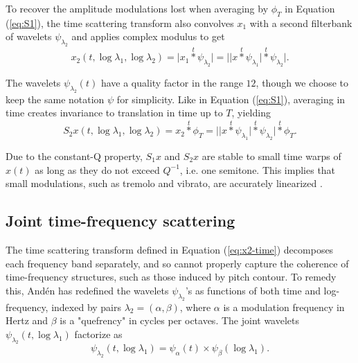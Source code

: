 \documentclass[twoside,a4paper]{article}
\begin{document}
To recover the amplitude modulations lost when averaging by $\phi_T$ in
Equation (\ref{eq:S1}), the time scattering transform also convolves $x_1$ with a second filterbank of wavelets $\psi_{\lambda_2}$ and applies complex modulus to get
\begin{equation}
x_2 (t, \log \lambda_1, \log \lambda_2) =
\vert x_1 \overset{t}{\ast} \psi_{\lambda_2} \vert =
\vert \vert x \overset{t}{\ast} \psi_{\lambda_{1}} \vert
\overset{t}{\ast} \psi_{\lambda_{2}} \vert.
\label{eq:x2-time}
\end{equation}

The wavelets $\psi_{\lambda_2}(t)$ have a quality factor in the range $1$\textendash$2$, though we choose to keep the same notation $\psi$ for simplicity. Like in Equation (\ref{eq:S1}), averaging in time creates invariance to translation in time up to $T$, yielding
\begin{equation}
S_2 x (t, \log \lambda_1, \log \lambda_2) =
x_2 \overset{t}{\ast} \phi_T =
\vert \vert x \overset{t}{\ast} \psi_{\lambda_{1}} \vert
\overset{t}{\ast} \psi_{\lambda_{2}} \vert
\overset{t}{\ast} \phi_T.
\label{eq:S2-time}
\end{equation}

Due to the constant-Q property, $S_1 x$ and $S_2 x$ are stable to small time warps of $x(t)$ as long as they do not exceed $Q^{-1}$, i.e. one semitone. This implies that small modulations, such as tremolo and vibrato, are accurately linearized \cite{Anden2012, Anden2014DSS}.

\subsection{Joint time-frequency scattering}

The time scattering transform defined in Equation (\ref{eq:x2-time}) decomposes each frequency band separately, and so cannot properly capture the coherence of time-frequency structures, such as those induced by pitch contour. To remedy this, And\'{e}n \cite{Anden2014PhD} has redefined the wavelets $\psi_{\lambda_2}$'s as functions of both time and log-frequency, indexed by pairs $\lambda_2 = (\alpha,\beta)$, where $\alpha$ is a modulation frequency in Hertz and $\beta$ is a "quefrency" in cycles per octaves. The joint wavelets $\psi_{\lambda_2}(t,\log \lambda_1)$ factorize as
\begin{equation}
\psi_{\lambda_2}(t,\log \lambda_1) = \psi_\alpha (t) \times \psi_\beta (\log \lambda_1).
\label{eq:wavelet-joint}
\end{equation}
\end{document}
